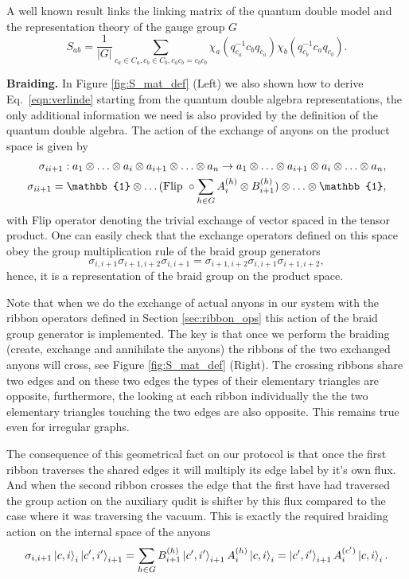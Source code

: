 \documentclass[two column]{article}
\begin{document}
A well known result links the linking matrix of the quantum double model and the representation theory of the gauge group $G$
\begin{equation}
	S_{ab} = \frac{1}{|G|}\sum_{c_a \in C_a, c_b \in C_b, c_a c_b = c_b c_b} \chi_a(q_{c_a}^{-1}c_b q_{c_a})\chi_b(q_{c_b}^{-1}c_a q_{c_b}).\label{eqn:verlinde}
\end{equation}
 
 \textbf{Braiding. }In Figure \ref{fig:S_mat_def} (Left) we also shown how to derive Eq.~\eqref{eqn:verlinde} starting from the quantum double algebra representations, the only additional information we need is also provided by the definition of the quantum double algebra.
The action of the exchange of anyons on the product space is  given by
\begin{equation}
	\begin{split}
		\boldmath{\sigma}_{i i+1}: a_1 \otimes \ldots \otimes a_i \otimes a_{i+1} \otimes \ldots \otimes a_n \rightarrow a_1 \otimes \ldots \otimes a_{i+1} \otimes a_{i} \otimes \ldots \otimes a_n,\\
		\boldmath{\sigma}_{i i+1} = \mathbb{1} \otimes \ldots (\text{Flip } \circ \sum_{h \in G} A_i^{(h)}\otimes B_{i+1}^{(h)}) \otimes \ldots \otimes \mathbb{1},
	\end{split}
\end{equation}
with Flip operator denoting the trivial exchange of vector spaced in the tensor product. One can easily check that the exchange operators defined on this space obey the group multiplication rule of the braid group generators
$$\sigma_{i,i+1}\sigma_{i+1,i+2}\sigma_{i, i+1} =\sigma_{i+1,i+2}\sigma_{i,i+1}\sigma_{i+1, i+2}, $$
hence, it is a representation of the braid group on the product space.

Note that when we do the exchange of actual anyons in our system with the ribbon operators defined in Section \ref{sec:ribbon_ops} this action of the braid group generator is implemented.
The key is that once we perform the braiding (create, exchange and annihilate the anyons) the ribbons of the two exchanged anyons will cross, see Figure \ref{fig:S_mat_def} (Right).
The crossing ribbons share two edges and on these two edges the types of their elementary triangles are opposite, furthermore, the looking at each ribbon individually the the two elementary triangles touching the two edges are also opposite. This remains true even for irregular graphs.

The consequence of this geometrical fact on our protocol is that once the first ribbon traverses the shared edges it will multiply its edge label by it's own flux. And when the second ribbon crosses the edge that the first have had traversed the group action on the auxiliary qudit is shifter by this flux compared to the case where it was traversing the vacuum. This is exactly the required braiding action on the internal space of the anyons
\begin{equation}
	\sigma_{i,i+1}\ket{c, i}_i\ket{c', i'}_{i+1} = \sum_{h \in G}B_{i+1}^{(h)}\ket{c',i'}_{i+1} A_i^{(h)}\ket{c,i}_i = \ket{c',i'}_{i+1} A_i^{(c')}\ket{c,i}_{i}. 
\end{equation}
\end{document}
